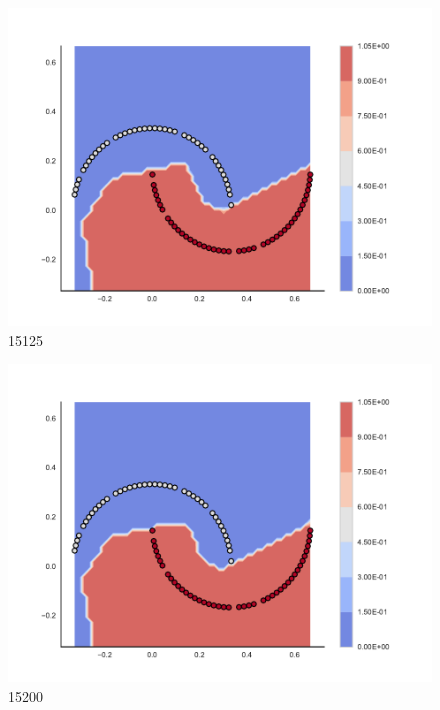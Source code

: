 \begin{subfigure}[b]{0.09\textwidth}
    \includegraphics[clip, trim=2.35cm 1.75cm 4.5cm 0cm,width=\textwidth]{img/convergence/15125.pdf}
    \caption{15125}
    \label{fig:convergence_15125}
\end{subfigure}
%
\begin{subfigure}[b]{0.09\textwidth}
    \includegraphics[clip, trim=2.35cm 1.75cm 4.5cm 0cm,width=\textwidth]{img/convergence/15200.pdf}
    \caption{15200}
    \label{fig:convergence_15200}
\end{subfigure}
%
